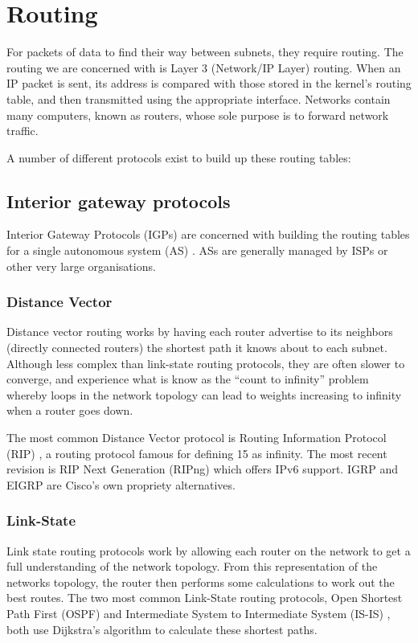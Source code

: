\documentclass[12pt]{report}
\begin{document}
\section{Routing}
For packets of data to find their way between subnets, they require routing.
The routing we are concerned with is Layer 3 (Network/IP Layer) routing. When
an IP packet is sent, its address is compared with those stored in the kernel's
routing table, and then transmitted using the appropriate interface. Networks
contain many computers, known as routers, whose sole purpose is to forward
network traffic.

A number of different protocols exist to build up these routing tables:

\subsection{Interior gateway protocols}
Interior Gateway Protocols (IGPs)  are concerned with building the routing tables for a single
autonomous system (AS) . ASs are generally
managed by ISPs or other very large organisations.  

\subsubsection{Distance Vector}
Distance vector routing works by having each router advertise to its neighbors
(directly connected routers) the shortest path it knows about to each subnet.
Although less complex than link-state routing protocols, they are often slower
to converge, and experience what is know as the ``count to infinity'' problem
whereby loops in the network topology can lead to weights increasing to
infinity when a router goes down. 

The most common Distance Vector protocol is Routing Information Protocol (RIP)
, a routing protocol famous for
defining 15 as infinity. The most recent revision is RIP Next Generation
(RIPng) which offers IPv6 support. IGRP and EIGRP are Cisco's own propriety
alternatives.

\subsubsection{Link-State}
Link state routing protocols work by allowing each router on the network to get
a full understanding of the network topology. From this representation of the
networks topology, the router then performs some calculations to work out the
best routes. The two most common Link-State routing protocols, Open Shortest
Path First (OSPF)  and
Intermediate System to Intermediate System (IS-IS)
, both use
Dijkstra's algorithm to calculate these shortest paths. 
\end{document}
